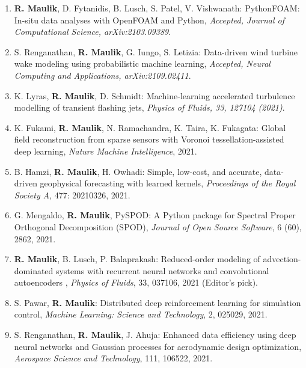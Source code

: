 \documentclass[letterpaper]{article}
\begin{document}
\begin{enumerate}

\item \textbf{R. Maulik}, D. Fytanidis, B. Lusch, S. Patel, V. Vishwanath: PythonFOAM: In-situ data analyses with OpenFOAM and Python, {\it Accepted, Journal of Computational Science, arXiv:2103.09389}.

\item S. Renganathan, \textbf{R. Maulik}, G. Iungo, S. Letizia: Data-driven wind turbine wake modeling using probabilistic machine learning, {\it Accepted, Neural Computing and Applications, arXiv:2109.02411}.

\item K. Lyras, \textbf{R. Maulik}, D. Schmidt: Machine-learning accelerated turbulence modelling of transient flashing jets, {\it Physics of Fluids, 33, 127104 (2021)}.

\item K. Fukami, \textbf{R. Maulik}, N. Ramachandra, K. Taira, K. Fukagata: Global field reconstruction from sparse sensors with Voronoi tessellation-assisted deep learning, {\it Nature Machine Intelligence}, 2021.

\item B. Hamzi, \textbf{R. Maulik}, H. Owhadi: Simple, low-cost, and accurate, data-driven geophysical forecasting with learned kernels, {\it Proceedings of the Royal Society A}, 477: 20210326, 2021.

\item G. Mengaldo, \textbf{R. Maulik}, PySPOD: A Python package for Spectral Proper Orthogonal Decomposition (SPOD), {\it Journal of Open Source Software}, 6 (60), 2862, 2021.

\item \textbf{R. Maulik}, B. Lusch, P. Balaprakash: Reduced-order modeling of advection-dominated systems with recurrent neural networks and convolutional autoencoders , {\it Physics of Fluids}, 33, 037106, 2021 (Editor's pick).

\item S. Pawar, \textbf{R. Maulik}: Distributed deep reinforcement learning for simulation control, {\it Machine Learning: Science and Technology}, 2, 025029, 2021.

\item S. Renganathan, \textbf{R. Maulik}, J. Ahuja: Enhanced data efficiency using deep neural networks and Gaussian processes for aerodynamic design optimization, {\it Aerospace Science and Technology}, 111, 106522, 2021.


\end{enumerate}
\end{document}
